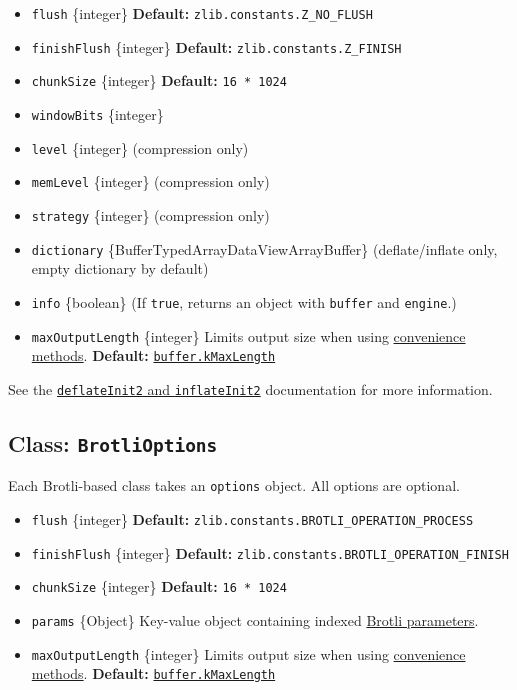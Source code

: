 \begin{itemize}
\tightlist
\item
  \texttt{flush} \{integer\} \textbf{Default:}
  \texttt{zlib.constants.Z\_NO\_FLUSH}
\item
  \texttt{finishFlush} \{integer\} \textbf{Default:}
  \texttt{zlib.constants.Z\_FINISH}
\item
  \texttt{chunkSize} \{integer\} \textbf{Default:} \texttt{16\ *\ 1024}
\item
  \texttt{windowBits} \{integer\}
\item
  \texttt{level} \{integer\} (compression only)
\item
  \texttt{memLevel} \{integer\} (compression only)
\item
  \texttt{strategy} \{integer\} (compression only)
\item
  \texttt{dictionary}
  \{Buffer\textbar TypedArray\textbar DataView\textbar ArrayBuffer\}
  (deflate/inflate only, empty dictionary by default)
\item
  \texttt{info} \{boolean\} (If \texttt{true}, returns an object with
  \texttt{buffer} and \texttt{engine}.)
\item
  \texttt{maxOutputLength} \{integer\} Limits output size when using
  \hyperref[convenience-methods]{convenience methods}. \textbf{Default:}
  \href{buffer.md\#bufferkmaxlength}{\texttt{buffer.kMaxLength}}
\end{itemize}

See the
\href{https://zlib.net/manual.html\#Advanced}{\texttt{deflateInit2} and
\texttt{inflateInit2}} documentation for more information.

\subsection{\texorpdfstring{Class:
\texttt{BrotliOptions}}{Class: BrotliOptions}}\label{class-brotlioptions}

Each Brotli-based class takes an \texttt{options} object. All options
are optional.

\begin{itemize}
\tightlist
\item
  \texttt{flush} \{integer\} \textbf{Default:}
  \texttt{zlib.constants.BROTLI\_OPERATION\_PROCESS}
\item
  \texttt{finishFlush} \{integer\} \textbf{Default:}
  \texttt{zlib.constants.BROTLI\_OPERATION\_FINISH}
\item
  \texttt{chunkSize} \{integer\} \textbf{Default:} \texttt{16\ *\ 1024}
\item
  \texttt{params} \{Object\} Key-value object containing indexed
  \hyperref[brotli-constants]{Brotli parameters}.
\item
  \texttt{maxOutputLength} \{integer\} Limits output size when using
  \hyperref[convenience-methods]{convenience methods}. \textbf{Default:}
  \href{buffer.md\#bufferkmaxlength}{\texttt{buffer.kMaxLength}}
\end{itemize}

